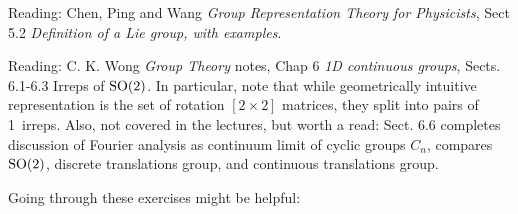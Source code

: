     Reading: Chen, Ping and Wang
    {\em Group Representation Theory for Physicists},
    {Sect 5.2} {\em Definition of a Lie group, with examples}.

    Reading:
 {C. K. Wong} {\em Group Theory} notes,
{Chap 6 {\em 1D continuous groups}}, %
Sects. 6.1-6.3 {Irreps of $\textrm{SO}(2)$}. In particular, note that while
geometrically intuitive representation is the set of rotation $[2\!\times\!2]$
matrices, they split into pairs of 1\dmn\ irreps.
Also, not covered in the lectures, but worth a read: Sect. 6.6 completes
    discussion of Fourier analysis as continuum limit of cyclic groups
    $C_n$, compares $\textrm{SO}(2)$, %
    discrete translations group, and continuous translations group.


Going through these exercises might be helpful:

